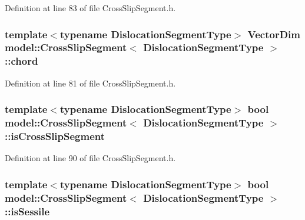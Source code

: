 Definition at line 83 of file Cross\+Slip\+Segment.\+h.

\hypertarget{classmodel_1_1_cross_slip_segment_a71dfabff3d1911aa136fe875a34c90a7}{}
\subsubsection[{chord}]{\setlength{\rightskip}{0pt plus 5cm}template$<$typename Dislocation\+Segment\+Type$>$ Vector\+Dim {\bf model\+::\+Cross\+Slip\+Segment}$<$ Dislocation\+Segment\+Type $>$\+::chord}\label{classmodel_1_1_cross_slip_segment_a71dfabff3d1911aa136fe875a34c90a7}


Definition at line 81 of file Cross\+Slip\+Segment.\+h.

\hypertarget{classmodel_1_1_cross_slip_segment_ab6248fc68a3660d4208c7a72582199b8}{}
\subsubsection[{is\+Cross\+Slip\+Segment}]{\setlength{\rightskip}{0pt plus 5cm}template$<$typename Dislocation\+Segment\+Type$>$ bool {\bf model\+::\+Cross\+Slip\+Segment}$<$ Dislocation\+Segment\+Type $>$\+::is\+Cross\+Slip\+Segment}\label{classmodel_1_1_cross_slip_segment_ab6248fc68a3660d4208c7a72582199b8}


Definition at line 90 of file Cross\+Slip\+Segment.\+h.

\hypertarget{classmodel_1_1_cross_slip_segment_a181c56ee259c5172591f478612261dd8}{}
\subsubsection[{is\+Sessile}]{\setlength{\rightskip}{0pt plus 5cm}template$<$typename Dislocation\+Segment\+Type$>$ bool {\bf model\+::\+Cross\+Slip\+Segment}$<$ Dislocation\+Segment\+Type $>$\+::is\+Sessile}\label{classmodel_1_1_cross_slip_segment_a181c56ee259c5172591f478612261dd8}


